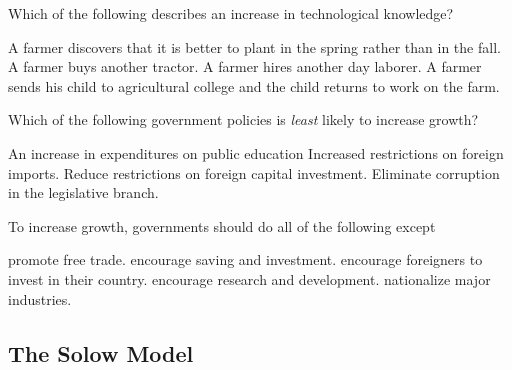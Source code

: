 \documentclass[addpoints,11pt]{exam}
\theoremstyle{definition}
\begin{document}
\begin{questions}
\question Which of the following describes an increase in technological knowledge?

\begin{choices}
	\CorrectChoice A farmer discovers that it is better to plant in the spring rather than in the fall.
	\choice A farmer buys another tractor.
	\choice A farmer hires another day laborer.
	\choice A farmer sends his child to agricultural college and the child returns to work on the farm.
\end{choices}

\question Which of the following government policies is \textit{least} likely to increase growth?

\begin{choices}
	\choice An increase in expenditures on public education
	\CorrectChoice Increased restrictions on foreign imports.
	\choice Reduce restrictions on foreign capital investment.
	\choice Eliminate corruption in the legislative branch.
\end{choices}

\question To increase growth, governments should do all of the following except

\begin{choices}
	\choice promote free trade.
	\choice encourage saving and investment.
	\choice encourage foreigners to invest in their country.
	\choice encourage research and development.
	\CorrectChoice nationalize major industries.
\end{choices}
	
\end{questions}

\subsection*{The Solow Model}
\end{document}
